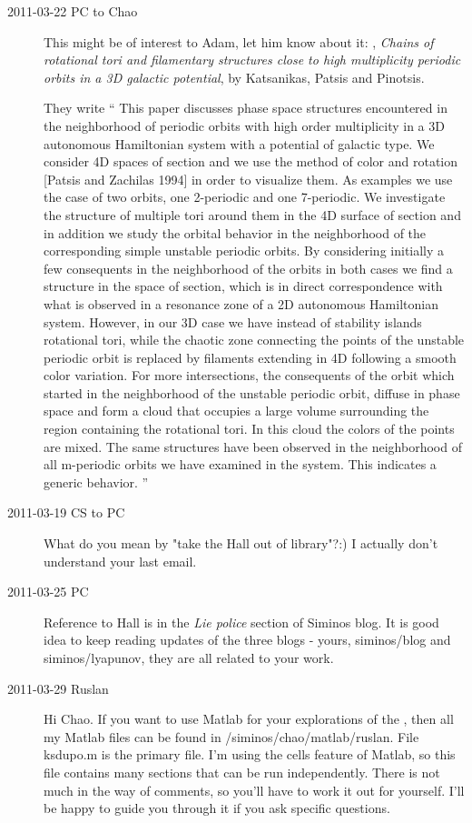 \begin{description}
\item[2011-03-22 PC to Chao]
This might be of interest to Adam, let him know about it:
,
\emph{Chains of rotational tori and filamentary structures close to high
 multiplicity periodic orbits in a 3D galactic potential},
 by Katsanikas, Patsis and Pinotsis.

They write
``
This paper discusses phase space structures encountered in the neighborhood of periodic orbits with high order multiplicity in a 3D autonomous Hamiltonian system with a potential of galactic type. We consider 4D spaces of section and we use the method of color and rotation [Patsis and Zachilas 1994] in order to visualize them. As examples we use the case of two orbits, one 2-periodic and one 7-periodic. We investigate the structure of multiple tori around them in the 4D surface of section and in addition we study the orbital behavior in the neighborhood of the corresponding simple unstable periodic orbits. By considering initially a few consequents in the neighborhood of the orbits in both cases we find a structure in the space of section, which is in direct correspondence with what is observed in a resonance zone of a 2D autonomous Hamiltonian system. However, in our 3D case we have instead of stability islands rotational tori, while the chaotic zone connecting the points of the unstable periodic orbit is replaced by filaments extending in 4D following a smooth color variation. For more intersections, the consequents of the orbit which started in the neighborhood of the unstable periodic orbit, diffuse in phase space and form a cloud that occupies a large volume surrounding the region containing the rotational tori. In this cloud the colors of the points are mixed. The same structures have been observed in the neighborhood of all m-periodic orbits we have examined in the system. This indicates a generic behavior.
''

\item[2011-03-19 CS to PC]
What do you mean by "take the Hall out of library"?:) I actually don't understand your last email.

\item[2011-03-25 PC]
Reference to Hall is in the {\em Lie police} section of Siminos
blog. It is good idea to keep reading updates of the three blogs - yours,
siminos/blog and siminos/lyapunov, they are all related to your work.

\item[2011-03-29 Ruslan]
Hi Chao.  If you want to use Matlab for your explorations of the \KS, then all my Matlab files can be found in /siminos/chao/matlab/ruslan.  File ksdupo.m is the primary file.  I'm using the cells feature of Matlab, so this file contains many sections that can be run independently.  There is not much in the way of comments, so you'll have to work it out for yourself.  I'll be happy to guide you through it if you ask specific questions.

\end{description}
